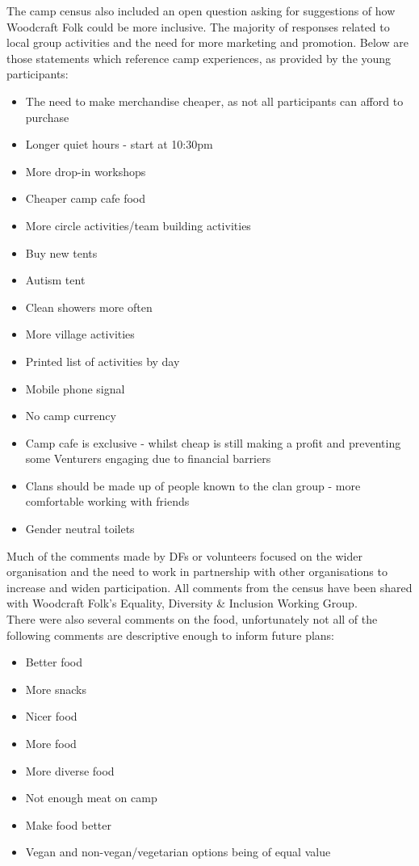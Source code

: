 The camp census also included an open question asking for suggestions of how Woodcraft Folk could be more inclusive. The majority of responses related to local group activities and the need for more marketing and promotion. Below are those statements which reference camp experiences, as provided by the young participants:
\begin{itemize}
    \item The need to make merchandise cheaper, as not all participants can afford to purchase
    \item Longer quiet hours - start at 10:30pm
    \item More drop-in workshops
    \item Cheaper camp cafe food
    \item More circle activities/team building activities
    \item Buy new tents
    \item Autism tent
    \item Clean showers more often
    \item More village activities
    \item Printed list of activities by day
    \item Mobile phone signal
    \item No camp currency
    \item Camp cafe is exclusive - whilst cheap is still making a profit and preventing some Venturers engaging due to financial barriers
    \item Clans should be made up of people known to the clan group - more comfortable working with friends
    \item Gender neutral toilets
\end{itemize}

Much of the comments made by DFs or volunteers focused on the wider organisation and the need to work in partnership with other organisations to increase and widen participation. All comments from the census have been shared with Woodcraft Folk's Equality, Diversity \& Inclusion Working Group.\\

There were also several comments on the food, unfortunately not all of the following comments are descriptive enough to inform future plans:
\begin{itemize}
    \item Better food
    \item More snacks
    \item Nicer food
    \item More food
    \item More diverse food
    \item Not enough meat on camp
    \item Make food better
    \item Vegan and non-vegan/vegetarian options being of equal value
\end{itemize}

